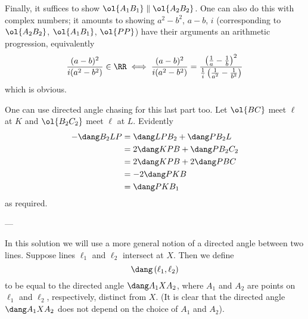 Finally, it suffices to show $\ol{A_1B_1} \parallel \ol{A_2B_2}$.
One can also do this with complex numbers;
it amounts to showing $a^2-b^2$, $a-b$, $i$
(corresponding to $\ol{A_2 B_2}$, $\ol{A_1 B_1}$, $\ol{PP}$)
have their arguments an arithmetic progression, equivalently
\[ \frac{(a-b)^2}{i(a^2-b^2)} \in \RR
  \iff
  \frac{(a-b)^2}{i(a^2-b^2)}
  = \frac{\left( \frac 1a-\frac1b \right)^2}
  {\frac1i\left(\frac{1}{a^2}-\frac{1}{b^2}\right)}
\]
which is obvious.
\begin{remark*}
One can use directed angle chasing for this last part too.
Let $\ol{BC}$ meet $\ell$ at $K$ and $\ol{B_2C_2}$ meet $\ell$ at $L$.
Evidently
\begin{align*}
  -\dang B_2LP &= \dang LPB_2 + \dang PB_2L \\
  &= 2 \dang KPB + \dang PB_2C_2 \\
  &= 2 \dang KPB + 2\dang PBC \\
  &= -2\dang PKB \\
  &= \dang PKB_1 \\
\end{align*}
as required.
\end{remark*}

---



In this solution we will use a more general notion of a directed angle
between two lines.
Suppose lines $\ell_1$ and $\ell_2$ intersect at $X$.
Then we define
\[ \dang \left( \ell_1, \ell_2 \right) \]
to be equal to the directed angle $\dang A_1XA_2$,
where $A_1$ and $A_2$ are points on $\ell_1$ and $\ell_2$,
respectively, distinct from $X$.
(It is clear that the directed angle $\dang A_1XA_2$ does not depend
on the choice of $A_1$ and $A_2$).

